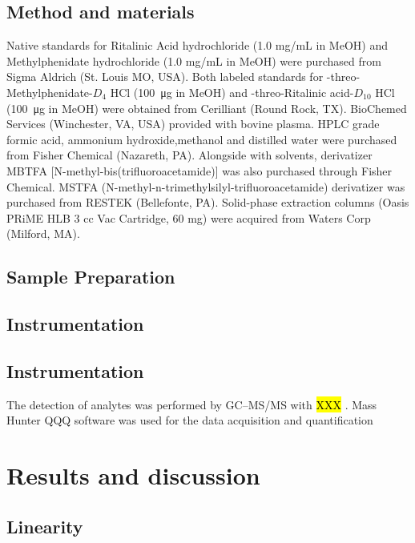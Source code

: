 \documentclass[journal=jacsat,manuscript=article]{achemso}
\begin{document}
\subsection{Method and materials}
Native standards for Ritalinic Acid hydrochloride (1.0 mg/mL in MeOH) and  Methylphenidate hydrochloride (1.0 mg/mL in MeOH) were purchased from Sigma Aldrich (St. Louis MO, USA). Both labeled standards for -threo-Methylphenidate-$D_4$ HCl (\SI{100}{\micro \gram} in MeOH) and -threo-Ritalinic acid-$D_{10}$ HCl (\SI{100}{\micro \gram} in MeOH) were obtained from Cerilliant (Round Rock, TX).
BioChemed Services (Winchester, VA, USA) provided with bovine plasma. HPLC grade formic acid, ammonium hydroxide,methanol and distilled water were purchased from Fisher Chemical (Nazareth, PA). Alongside with solvents, derivatizer MBTFA [N-methyl-bis(trifluoroacetamide)] was also purchased through Fisher Chemical.  MSTFA (N-methyl-n-trimethylsilyl-trifluoroacetamide) derivatizer was purchased from RESTEK (Bellefonte, PA). Solid-phase extraction columns (Oasis PRiME HLB 3 cc Vac Cartridge, 60 mg) were acquired from Waters Corp (Milford, MA).





\subsection{Sample Preparation}


\subsection{Instrumentation}




\subsection{Instrumentation}

The detection of analytes was performed by GC–MS/MS with \hl {XXX} . Mass Hunter QQQ  software was used for the data acquisition and quantification \cite{del2007liquid}



\section{Results and discussion}
\subsection{Linearity}
\end{document}
